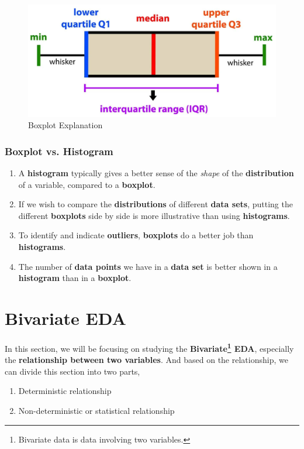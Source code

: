 \documentclass[math,code]{amznotes}
\theoremstyle{remark}
\begin{document}
\begin{figure}[H]
    \centering
    \includegraphics[width=0.75\linewidth]{images/chapter3-boxplot-example.png}
    \caption{Boxplot Explanation}
    \label{fig:chapter3-boxplot-explanation}
\end{figure}
\subsubsection{Boxplot vs. Histogram}
\begin{enumerate}
    \item A \textbf{histogram} typically gives a better sense of the \textit{shape} of the \textbf{distribution} of a variable, compared to a \textbf{boxplot}.
    \item If we wish to compare the \textbf{distributions} of different \textbf{data sets}, putting the different \textbf{boxplots} side by side is more illustrative than using \textbf{histograms}.
    \item To identify and indicate \textbf{outliers}, \textbf{boxplots} do a better job than \textbf{histograms}.
    \item The number of \textbf{data points} we have in a \textbf{data set} is better shown in a \textbf{histogram} than in a \textbf{boxplot}.
\end{enumerate}

\section{Bivariate EDA}
In this section, we will be focusing on studying the \textbf{Bivariate\footnote{Bivariate data is data involving two variables.} EDA}, especially the \textbf{relationship between two variables}. And based on the relationship, we can divide this section into two parts,
\begin{enumerate}
    \item Deterministic relationship
    \item Non-deterministic or statistical relationship
\end{enumerate}
\end{document}
